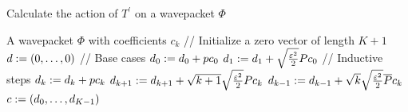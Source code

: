 \begin{algorithm}
\caption{Calculate the action of $T^\prime$ on a wavepacket $\Phi$}
\label{al:derivative_of_phi}
\begin{algorithmic}
  \REQUIRE A wavepacket $\Phi$ with coefficients $c_k$
  \STATE // Initialize a zero vector of length $K+1$
  \STATE $d := \left(0, \ldots, 0\right)$
  \STATE // Base cases
  \STATE $d_0 := d_0 + p c_0$
  \STATE $d_1 := d_1 + \sqrt{\frac{\varepsilon^2}{2}} P c_0$
  \STATE // Inductive steps
    \STATE $d_k := d_k + p c_k$
    \STATE $d_{k+1} := d_{k+1} + \sqrt{k+1} \sqrt{\frac{\varepsilon^2}{2}} P c_k$
    \STATE $d_{k-1} := d_{k-1} + \sqrt{k} \sqrt{\frac{\varepsilon^2}{2}} \overline{P} c_k$
  \ENDFOR
  \RETURN $c := \left(d_0, \ldots, d_{K-1}\right)$
\end{algorithmic}
\end{algorithm}
